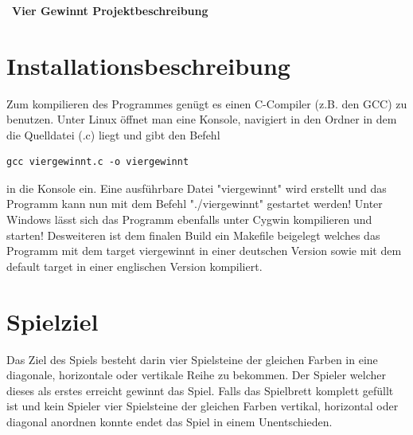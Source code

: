 \documentclass[10pt,a4paper,titlepage]{article}
\begin{document}
\tableofcontents
\ \\\\\\\
\textbf{\large Vier Gewinnt Projektbeschreibung}\\
\section{Installationsbeschreibung}
Zum kompilieren des Programmes genügt es einen C-Compiler (z.B. den GCC) zu benutzen.
Unter Linux öffnet man eine Konsole, navigiert in den Ordner in dem die Quelldatei (.c) liegt
und gibt den Befehl 
\begin{lstlisting}
gcc viergewinnt.c -o viergewinnt
\end{lstlisting}
in die Konsole ein.
Eine ausführbare Datei "viergewinnt" wird erstellt und das Programm kann nun mit dem Befehl "./viergewinnt" gestartet werden!
Unter Windows lässt sich das Programm ebenfalls unter Cygwin kompilieren und starten!
Desweiteren ist dem finalen Build ein Makefile beigelegt welches das Programm mit dem target viergewinnt in einer deutschen Version sowie mit dem default target in einer englischen Version kompiliert.
\section{Spielziel}
Das Ziel des Spiels besteht darin vier Spielsteine der gleichen Farben in eine diagonale, horizontale oder vertikale Reihe zu bekommen. Der Spieler welcher dieses als erstes erreicht gewinnt das Spiel. Falls das Spielbrett komplett gefüllt ist und kein Spieler vier Spielsteine der gleichen Farben vertikal, horizontal oder diagonal anordnen konnte endet das Spiel in einem Unentschieden.
\end{document}
